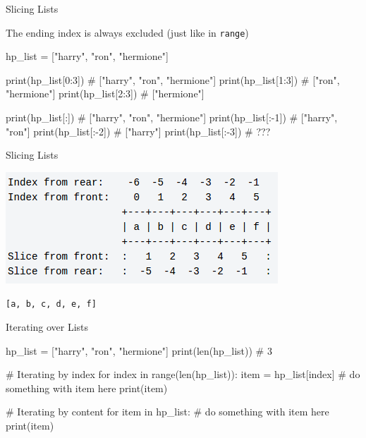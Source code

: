 \begin{frame}[fragile]{Slicing Lists}

	The ending index is always excluded (just like in \texttt{range})

    \begin{pythoncode}

hp_list = ["harry", "ron", "hermione"]
	
print(hp_list[0:3]) # ["harry", "ron", "hermione"]
print(hp_list[1:3]) # ["ron", "hermione"]
print(hp_list[2:3]) # ["hermione"]

print(hp_list[:]) # ["harry", "ron", "hermione"]
print(hp_list[:-1]) # ["harry", "ron"]
print(hp_list[:-2]) # ["harry"]
print(hp_list[:-3]) # ???

    \end{pythoncode}



\end{frame}

\begin{frame}[fragile]{Slicing Lists}

    \includegraphics[width=\textwidth]{04_Data_Structures/indexing.png}

	\begin{center}
		
		\texttt{[a, b, c, d, e, f]}

	\end{center}

\end{frame}


\begin{frame}[fragile]{Iterating over Lists}
        \begin{pythoncode}
hp_list = ["harry", "ron", "hermione"]
print(len(hp_list)) # 3

# Iterating by index
for index in range(len(hp_list)):
    item = hp_list[index]
    # do something with item here
    print(item)

# Iterating by content
for item in hp_list:
    # do something with item here
    print(item)
        \end{pythoncode}


\end{frame}

